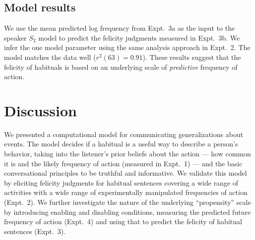 \documentclass[10pt,letterpaper]{article}
\begin{document}


%
%
%
%

\subsection{Model results}

We use the mean predicted log frequency from Expt.~3a as the input to the speaker $S_2$ model to predict the felicity judgments measured in Expt.~3b.
We infer the one model parameter using the same analysis approach in Expt.~2. 
The model matches the data well ($r^2(63) = 0.91$).
These results suggest that the felicity of habituals is based on an underlying scale of \emph{predictive} frequency of action.


\section{Discussion}

We presented a computational model for communicating generalizations about events.
The model decides if a habitual is a useful way to describe a person's behavior, taking into the listener's prior beliefs about the action --- how common it is and the likely frequency of action (measured in Expt.~1) --- and the basic conversational principles to be truthful and informative.
We validate this model by eliciting felicity judgments for habitual sentences covering a wide range of activities with a wide range of experimentally manipulated frequencies of action (Expt.~2).
We further investigate the nature of the underlying ``propensity'' scale by introducing enabling and disabling conditions, measuring the predicted future frequency of action (Expt.~4) and using that to predict the felicity of habitual sentences (Expt.~3). 
\end{document}
